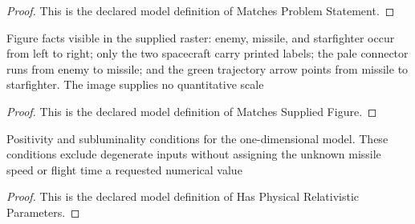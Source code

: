 \begin{proof}
  This is the declared model definition of Matches Problem Statement.
\end{proof}
\begin{definition}
  \label{def:physics:phyx-mini-0512:phyxminiproblems-problemphyxmini0512-matchessuppliedfigure}
  Figure facts visible in the supplied raster: enemy, missile, and starfighter occur from left to right; only the two spacecraft carry printed labels; the pale connector runs from enemy to missile; and the green trajectory arrow points from missile to starfighter. The image supplies no quantitative scale
\end{definition}
\begin{proof}
  This is the declared model definition of Matches Supplied Figure.
\end{proof}
\begin{definition}
  \label{def:physics:phyx-mini-0512:phyxminiproblems-problemphyxmini0512-hasphysicalrelativisticparameters}
  Positivity and subluminality conditions for the one-dimensional model. These conditions exclude degenerate inputs without assigning the unknown missile speed or flight time a requested numerical value
\end{definition}
\begin{proof}
  This is the declared model definition of Has Physical Relativistic Parameters.
\end{proof}
